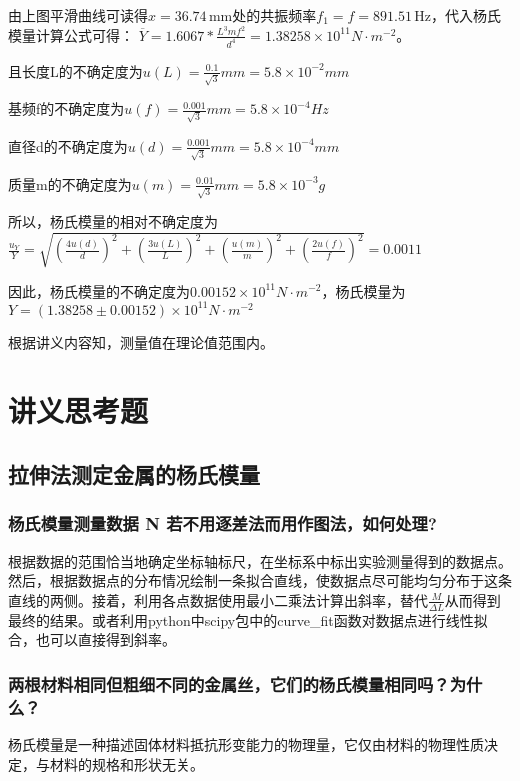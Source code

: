 \documentclass[UTF-8,twoside,cs4size]{ctexart}
\begin{document}
由上图平滑曲线可读得$ x=36.74\,\mathrm{mm} $处的共振频率$ f_1=f=891.51\,\mathrm{Hz} $，代入杨氏模量计算公式可得：
$\overline Y  = 1.6067*\frac{{L^3}m{f^2}}{{d^4}} = 1.38258 \times {10^{11}}N \cdot {m^{ - 2}}$。\par
且长度L的不确定度为$u\left( L \right) = \frac{{0.1}}{{\sqrt 3 }}mm = 5.8 \times {10^{ - 2}}mm$\par
基频f的不确定度为$u\left( f \right) = \frac{{0.001}}{{\sqrt 3 }}mm = 5.8 \times {10^{ - 4}}Hz$\par
直径d的不确定度为$u\left( d \right) = \frac{{0.001}}{{\sqrt 3 }}mm = 5.8 \times {10^{ - 4}}mm$\par
质量m的不确定度为$u\left( m \right) = \frac{{0.01}}{{\sqrt 3 }}mm = 5.8 \times {10^{ - 3}}g$\par
所以，杨氏模量的相对不确定度为$\frac{{{u_Y}}}{Y} = \sqrt {{{\left( {\frac{{4u\left( d \right)}}{d}} \right)}^2} + {{\left( {\frac{{3u\left( L \right)}}{L}} \right)}^2} + {{\left( {\frac{{u\left( m \right)}}{m}} \right)}^2} + {{\left( {\frac{{2u\left( {f} \right)}}{{f}}} \right)}^2}}  = 0.0011$\par
因此，杨氏模量的不确定度为$0.00152 \times {10^{ 11}}N \cdot {m^{ - 2}}$，杨氏模量为$Y = \left( {1.38258 \pm 0.00152} \right) \times {10^{ 11}}N \cdot {m^{ - 2}}$\par
根据讲义内容知，测量值在理论值范围内。

\section{讲义思考题}
\subsection{拉伸法测定金属的杨氏模量}
\subsubsection{杨氏模量测量数据 N 若不用逐差法而用作图法，如何处理?}
根据数据的范围恰当地确定坐标轴标尺，在坐标系中标出实验测量得到的数据点。然后，根据数据点的分布情况绘制一条拟合直线，使数据点尽可能均匀分布于这条直线的两侧。接着，利用各点数据使用最小二乘法计算出斜率，替代$\frac{M}{\varDelta L}$从而得到最终的结果。或者利用python中scipy包中的curve_fit函数对数据点进行线性拟合，也可以直接得到斜率。
\subsubsection{两根材料相同但粗细不同的金属丝，它们的杨氏模量相同吗？为什么？}
杨氏模量是一种描述固体材料抵抗形变能力的物理量，它仅由材料的物理性质决定，与材料的规格和形状无关。
\end{document}
